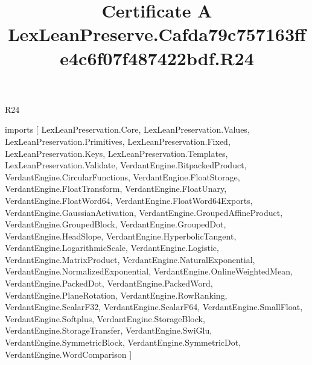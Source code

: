 \begin{lexlean}{R24}
\title{Certificate A LexLeanPreserve.Cafda79c757163ffe4c6f07f487422bdf.R24}
\begin{coremodule}
imports [
  LexLeanPreservation.Core,
  LexLeanPreservation.Values,
  LexLeanPreservation.Primitives,
  LexLeanPreservation.Fixed,
  LexLeanPreservation.Keys,
  LexLeanPreservation.Templates,
  LexLeanPreservation.Validate,
  VerdantEngine.BitpackedProduct,
  VerdantEngine.CircularFunctions,
  VerdantEngine.FloatStorage,
  VerdantEngine.FloatTransform,
  VerdantEngine.FloatUnary,
  VerdantEngine.FloatWord64,
  VerdantEngine.FloatWord64Exports,
  VerdantEngine.GaussianActivation,
  VerdantEngine.GroupedAffineProduct,
  VerdantEngine.GroupedBlock,
  VerdantEngine.GroupedDot,
  VerdantEngine.HeadSlope,
  VerdantEngine.HyperbolicTangent,
  VerdantEngine.LogarithmicScale,
  VerdantEngine.Logistic,
  VerdantEngine.MatrixProduct,
  VerdantEngine.NaturalExponential,
  VerdantEngine.NormalizedExponential,
  VerdantEngine.OnlineWeightedMean,
  VerdantEngine.PackedDot,
  VerdantEngine.PackedWord,
  VerdantEngine.PlaneRotation,
  VerdantEngine.RowRanking,
  VerdantEngine.ScalarF32,
  VerdantEngine.ScalarF64,
  VerdantEngine.SmallFloat,
  VerdantEngine.Softplus,
  VerdantEngine.StorageBlock,
  VerdantEngine.StorageTransfer,
  VerdantEngine.SwiGlu,
  VerdantEngine.SymmetricBlock,
  VerdantEngine.SymmetricDot,
  VerdantEngine.WordComparison
]


\end{coremodule}
\end{lexlean}
